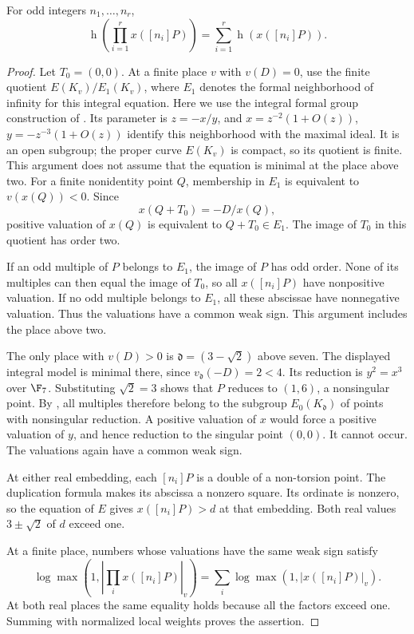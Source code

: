 \begin{lemma}\label{v9:lem:product}
For odd integers $n_1,\ldots,n_r$,
\[
 \operatorname{h}\!\left(\prod_{i=1}^r x([n_i]P)\right)
 =\sum_{i=1}^r\operatorname{h}(x([n_i]P)).
\]
\end{lemma}
\begin{proof}
Let $T_0=(0,0)$. At a finite place $v$ with $v(D)=0$, use the finite quotient $E(K_v)/E_1(K_v)$, where $E_1$ denotes the formal neighborhood of infinity for this integral equation.
Here we use the integral formal group construction of
\cite[Chapter IV, Sections 1--3]{silverman}. Its parameter is $z=-x/y$,
and $x=z^{-2}(1+O(z))$, $y=-z^{-3}(1+O(z))$ identify this neighborhood
with the maximal ideal. It is an open subgroup; the proper curve
$E(K_v)$ is compact, so its quotient is finite. This argument does not
assume that the equation is minimal at the place above two. For a finite nonidentity point $Q$, membership in $E_1$ is equivalent to $v(x(Q))<0$. Since
\[
 x(Q+T_0)=-D/x(Q),
\]
positive valuation of $x(Q)$ is equivalent to $Q+T_0\in E_1$. The image of $T_0$ in this quotient has order two.

If an odd multiple of $P$ belongs to $E_1$, the image of $P$ has odd order. None of its multiples can then equal the image of $T_0$, so all $x([n_i]P)$ have nonpositive valuation. If no odd multiple belongs to $E_1$, all these abscissae have nonnegative valuation. Thus the valuations have a common weak sign. This argument includes the place above two.

The only place with $v(D)>0$ is $\mathfrak d=(3-\sqrt2)$ above seven. The displayed integral model is minimal there, since $v_{\mathfrak d}(-D)=2<4$. Its reduction is $y^2=x^3$ over $\F_7$. Substituting $\sqrt2=3$ shows that $P$ reduces to $(1,6)$, a nonsingular point. By \cite[Proposition VII.2.1, pp. 188--190]{silverman}, all multiples therefore belong to the subgroup $E_0(K_{\mathfrak d})$ of points with nonsingular reduction. A positive valuation of $x$ would force a positive valuation of $y$, and hence reduction to the singular point $(0,0)$. It cannot occur. The valuations again have a common weak sign.

At either real embedding, each $[n_i]P$ is a double of a non-torsion point. The duplication formula makes its abscissa a nonzero square. Its ordinate is nonzero, so the equation of $E$ gives $x([n_i]P)>d$ at that embedding. Both real values $3\pm\sqrt2$ of $d$ exceed one.

At a finite place, numbers whose valuations have the same weak sign satisfy
\[
 \log\max\left(1,\left|\prod_i x([n_i]P)\right|_v\right)
 =\sum_i\log\max(1,|x([n_i]P)|_v).
\]
At both real places the same equality holds because all the factors exceed one. Summing with normalized local weights proves the assertion.
\end{proof}

